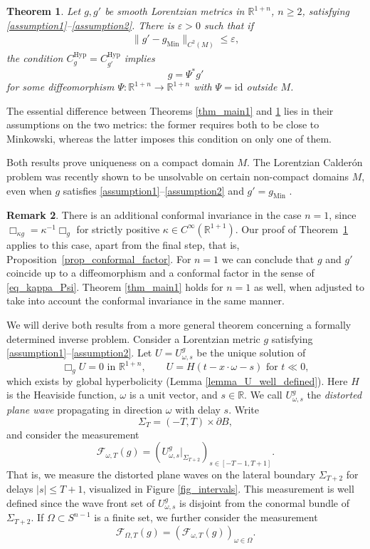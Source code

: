 \documentclass[11pt,letterpaper]{amsart}
\newtheorem{Theorem}{Theorem}[section]
\theoremstyle{definition}
\newtheorem{Remark}[Theorem]{Remark}
\numberwithin{equation}{section}
\newcommand{\mR}{\mathbb{R}}                    %
\newcommand{\norm}[1]{\lVert #1 \rVert}         %
\newcommand{\id}{\mathrm{id}}
\newcommand{\eps}{\varepsilon}
\newcommand{\p}{\partial}
\newcommand{\gm}{g_{\mathrm{Min}}}
\def\p{\partial}
\def\R{\mathbb R}
\begin{document}
\begin{Theorem} \label{thm_main_semiglob}
Let $g, g'$ be smooth Lorentzian metrics  in $\mR^{1+n}$, $n \ge 2$,  satisfying \eqref{assumption1}--\eqref{assumption2}. There is $\eps > 0$ such that if
\begin{gather*}
\norm{g'-\gm}_{C^{2}(M)} \leq \eps,
\end{gather*}
the condition $C_{g}^{\mathrm{Hyp}} = C_{g'}^{\mathrm{Hyp}}$ implies 
\[
g = \Psi^* g'
\]
for some diffeomorphism $\Psi: \mR^{1+n} \to \mR^{1+n}$ with $\Psi = \id$ outside $M$.
\end{Theorem}

The essential difference between Theorems \ref{thm_main1} and \ref{thm_main_semiglob} lies in their assumptions on the two metrics: the former requires both to be close to Minkowski, whereas the latter imposes this condition on only one of them. 

Both results prove uniqueness on a compact domain $M$. The Lorentzian Calder\'on problem was recently shown to be unsolvable on certain non-compact domains $M$, even when $g$ satisfies \eqref{assumption1}--\eqref{assumption2} and $g' = \gm$ \cite{2604.20320}.  

\begin{Remark}
There is an additional conformal invariance in the case $n = 1$, since $\Box_{\kappa g} = \kappa^{-1} \Box_g$ for strictly positive $\kappa \in C^\infty(\R^{1+1})$. Our proof of Theorem~\ref{thm_main_semiglob} applies to this case, apart from the final step, that is, Proposition~\ref{prop_conformal_factor}. For $n=1$ we can conclude that $g$ and $g'$ coincide up to a diffeomorphism and a conformal factor in the sense of \eqref{eq_kappa_Psi}. Theorem \ref{thm_main1} holds for $n = 1$ as well, when adjusted to take into account the conformal invariance in the same manner.
\end{Remark}

We will derive both results from a more general theorem concerning a formally determined inverse problem. Consider a Lorentzian metric $g$
satisfying \eqref{assumption1}--\eqref{assumption2}. Let $U = U_{\omega,s}^g$ be the unique solution of 
\[
\Box_g U = 0 \text{ in $\mR^{1+n}$}, \qquad U = H(t-x \cdot \omega-s) \text{ for $t \ll 0$},
\]
which exists by global hyperbolicity (Lemma \ref{lemma_U_well_defined}). Here $H$ is the Heaviside function, $\omega$ is a unit vector, and $s \in \R$. We call $U_{\omega,s}^g$ the {\em distorted plane wave} propagating in direction $\omega$ with delay $s$. 
Write 
\[
\Sigma_T = (-T,T) \times \p B,
\]
and consider the measurement 
\[
\mathcal{F}_{\omega,T}(g) = (U_{\omega,s}^g|_{\Sigma_{T+2}})_{s \in [-T-1,T+1]}.
\]
That is, we measure the distorted plane waves on the lateral boundary $\Sigma_{T + 2}$ for delays $|s| \leq T+1$, visualized in Figure \ref{fig_intervals}. This measurement is well defined since the wave front set of $U_{\omega,s}^g$ is disjoint from the conormal bundle of $\Sigma_{T+2}$. If $\Omega \subset S^{n-1}$ is a finite set, we further consider the measurement 
\[
\mathcal{F}_{\Omega,T}(g) = (\mathcal{F}_{\omega,T}(g))_{\omega \in \Omega}.
\]
\end{document}
